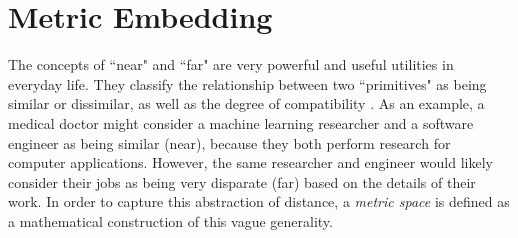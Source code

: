 \section{Metric Embedding} \label{sec:MetricEmedding}

The concepts of ``near" and ``far" are very powerful and useful utilities in everyday life.  They classify the relationship between two ``primitives" as being similar or dissimilar, as well as the degree of compatibility \citep{Thorstensen2009ManifoldThesis}. As an example, a medical doctor might consider a machine learning researcher and a software engineer as being similar (near), because they both perform research for computer applications.  However, the same researcher and engineer would likely consider their jobs as being very disparate (far) based on the details of their work.  In order to capture this abstraction of distance, a \textit{metric space} is defined as a mathematical construction  of this vague generality.

